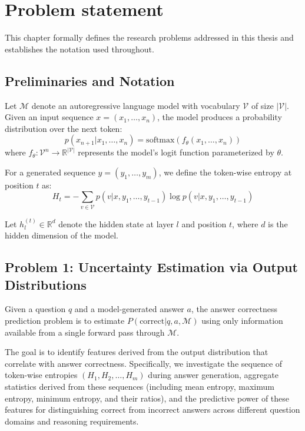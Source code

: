 \chapter{Problem statement}

This chapter formally defines the research problems addressed in this thesis and establishes the notation used throughout.

\section{Preliminaries and Notation}

Let $\mathcal{M}$ denote an autoregressive language model with vocabulary $\mathcal{V}$ of size $|\mathcal{V}|$. Given an input sequence $x = (x_1, \ldots, x_n)$, the model produces a probability distribution over the next token:
\begin{equation}
    p(x_{n+1} | x_1, \ldots, x_n) = \text{softmax}(f_\theta(x_1, \ldots, x_n))
    \label{eq:autoregressive}
\end{equation}
where $f_\theta: \mathcal{V}^n \rightarrow \mathbb{R}^{|\mathcal{V}|}$ represents the model's logit function parameterized by $\theta$.

For a generated sequence $y = (y_1, \ldots, y_m)$, we define the token-wise entropy at position $t$ as:
\begin{equation}
    H_t = -\sum_{v \in \mathcal{V}} p(v | x, y_1, \ldots, y_{t-1}) \log p(v | x, y_1, \ldots, y_{t-1})
    \label{eq:token_entropy}
\end{equation}

Let $h_l^{(t)} \in \mathbb{R}^d$ denote the hidden state at layer $l$ and position $t$, where $d$ is the hidden dimension of the model.

\section{Problem 1: Uncertainty Estimation via Output Distributions}

\begin{Def}
Given a question $q$ and a model-generated answer $a$, the answer correctness prediction problem is to estimate $P(\text{correct} | q, a, \mathcal{M})$ using only information available from a single forward pass through $\mathcal{M}$.
\end{Def}

The goal is to identify features derived from the output distribution that correlate with answer correctness. Specifically, we investigate the sequence of token-wise entropies $(H_1, H_2, \ldots, H_m)$ during answer generation, aggregate statistics derived from these sequences (including mean entropy, maximum entropy, minimum entropy, and their ratios), and the predictive power of these features for distinguishing correct from incorrect answers across different question domains and reasoning requirements.

